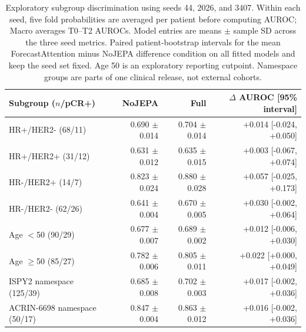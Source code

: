 \begin{table}[t]
\centering
\small
\caption{Exploratory subgroup discrimination using seeds 44, 2026, and 3407. Within each seed, five fold probabilities are averaged per patient before computing AUROC; Macro averages T0--T2 AUROCs. Model entries are means $\pm$ sample SD across the three seed metrics. Paired patient-bootstrap intervals for the mean ForecastAttention minus NoJEPA difference condition on all fitted models and keep the seed set fixed. Age 50 is an exploratory reporting cutpoint. Namespace groups are parts of one clinical release, not external cohorts.}
\label{tab:subgroups}
\begin{tabular}{lrrr}
\toprule
Subgroup ($n$/pCR+) & NoJEPA & Full & $\Delta$ AUROC [95\% interval] \\
\midrule
HR+/HER2- (68/11) & 0.690 $\pm$ 0.014 & 0.704 $\pm$ 0.014 & +0.014 [-0.024, +0.050] \\
HR+/HER2+ (31/12) & 0.631 $\pm$ 0.012 & 0.635 $\pm$ 0.015 & +0.003 [-0.067, +0.074] \\
HR-/HER2+ (14/7) & 0.823 $\pm$ 0.024 & 0.880 $\pm$ 0.028 & +0.057 [-0.025, +0.173] \\
HR-/HER2- (62/26) & 0.641 $\pm$ 0.004 & 0.670 $\pm$ 0.005 & +0.030 [-0.002, +0.064] \\
Age $<$50 (90/29) & 0.677 $\pm$ 0.007 & 0.689 $\pm$ 0.002 & +0.012 [-0.006, +0.030] \\
Age $\geq$50 (85/27) & 0.782 $\pm$ 0.006 & 0.805 $\pm$ 0.011 & +0.022 [+0.000, +0.049] \\
ISPY2 namespace (125/39) & 0.685 $\pm$ 0.008 & 0.702 $\pm$ 0.003 & +0.017 [-0.002, +0.036] \\
ACRIN-6698 namespace (50/17) & 0.847 $\pm$ 0.004 & 0.863 $\pm$ 0.012 & +0.016 [-0.002, +0.036] \\
\bottomrule
\end{tabular}
\end{table}
